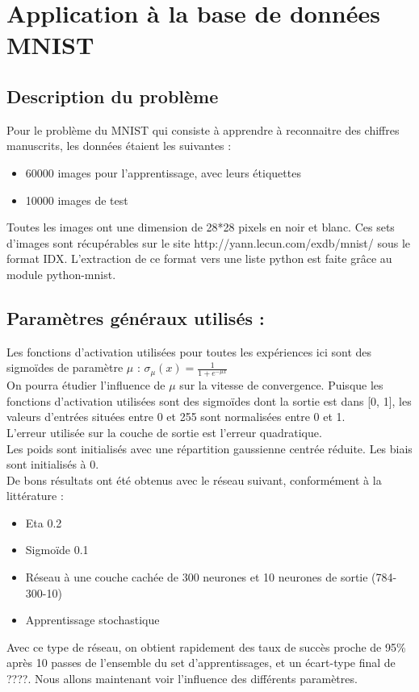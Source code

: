 \section{Application à la base de données MNIST}

\subsection*{Description du problème} %

Pour le problème du MNIST qui consiste à apprendre à reconnaitre des chiffres manuscrits, les données étaient les suivantes : 
\begin{itemize}
	\item 60000 images pour l’apprentissage, avec leurs étiquettes
	\item 10000 images de test
\end{itemize}

Toutes les images ont une dimension de 28*28 pixels en noir et blanc. Ces sets d’images sont récupérables sur le site http://yann.lecun.com/exdb/mnist/ sous le format IDX. L’extraction de ce format vers une liste python est faite grâce au module python-mnist.

\subsection*{Paramètres généraux utilisés :} %
Les fonctions d’activation utilisées pour toutes les expériences ici sont des sigmoïdes de paramètre $\mu$ : 
$\sigma_\mu(x) = \frac{1}{1+e^{-\mu x}}$\\
On pourra étudier l’influence de $\mu$ sur la vitesse de convergence.
Puisque les fonctions d’activation utilisées sont des sigmoïdes dont la sortie est dans [0, 1], les valeurs d’entrées situées entre 0 et 255 sont normalisées entre 0 et 1.\\
L’erreur utilisée sur la couche de sortie est l’erreur quadratique.\\
Les poids sont initialisés avec une répartition gaussienne centrée réduite. Les biais sont initialisés à 0.\\
De bons résultats ont été obtenus avec le réseau suivant, conformément à la littérature :
\begin{itemize}
	\item Eta 0.2
	\item Sigmoïde 0.1
	\item Réseau à une couche cachée de 300 neurones et 10 neurones de sortie (784-300-10)
	\item Apprentissage stochastique
\end{itemize}
Avec ce type de réseau, on obtient rapidement des taux de succès proche de 95\% après 10 passes de l’ensemble du set d’apprentissages, et un écart-type final de ????. Nous allons maintenant voir l’influence des différents paramètres.

